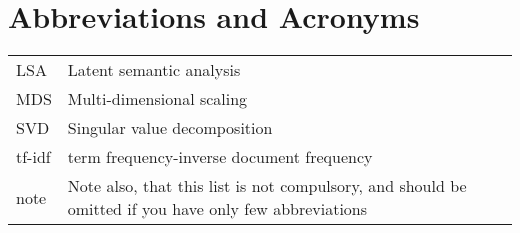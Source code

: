 \chapter*{Abbreviations and Acronyms}


\noindent
\begin{longtable}{@{}p{}p{}@{}}
LSA & Latent semantic analysis \\
MDS & Multi-dimensional scaling \\
SVD & Singular value decomposition \\
tf-idf & term frequency-inverse document frequency \\
note & Note also, that this list is not compulsory, and should be 
omitted if you have only few abbreviations \\

\end{longtable}
